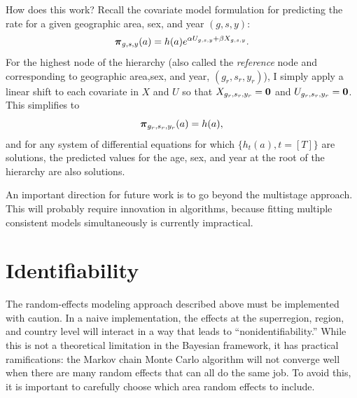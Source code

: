 How does this work?  Recall the covariate model formulation for
predicting the rate for a given geographic area, sex, and year $(g,s,y)$:
\[
{\boldsymbol{\pi}}_{g,s,y}(a) = h(a)e^{\alpha U_{g,s,y} + \beta X_{g,s,y}}.
\]
For the highest node of the hierarchy (also called the
\emph{reference} node and corresponding to geographic area,sex, and year, $(g_r, s_r,
y_r)$), I simply apply a linear shift to each covariate in $X$ and $U$
so that $X_{{g_r},{s_r},{y_r}} = \mathbf{0}$ and $U_{g_r,s_r,y_r} = \mathbf{0}$.  This
simplifies to \[ {\boldsymbol{\pi}}_{g_r,s_r,y_r}(a) = h(a), \] and for any system
of differential equations for which $\{h_t(a), t=[T]\}$ are
solutions, the predicted values for the age, sex, and year at the root of
the hierarchy are also solutions.

An important direction for future work is to go beyond the multistage
approach.  This will probably require innovation in algorithms,
because fitting multiple consistent models simultaneously is currently
impractical.

\section{Identifiability}
The random-effects modeling approach described above must be
implemented with caution.  In a naive implementation, the effects at
the superregion, region, and country level will interact in a way
that leads to ``nonidentifiability.''  While this is not a
theoretical limitation in the Bayesian framework, it has practical
ramifications: the Markov chain Monte Carlo algorithm will not converge well when there
are many random effects that can all do the same job.  To avoid this,
it is important to carefully choose which area random effects to include.

